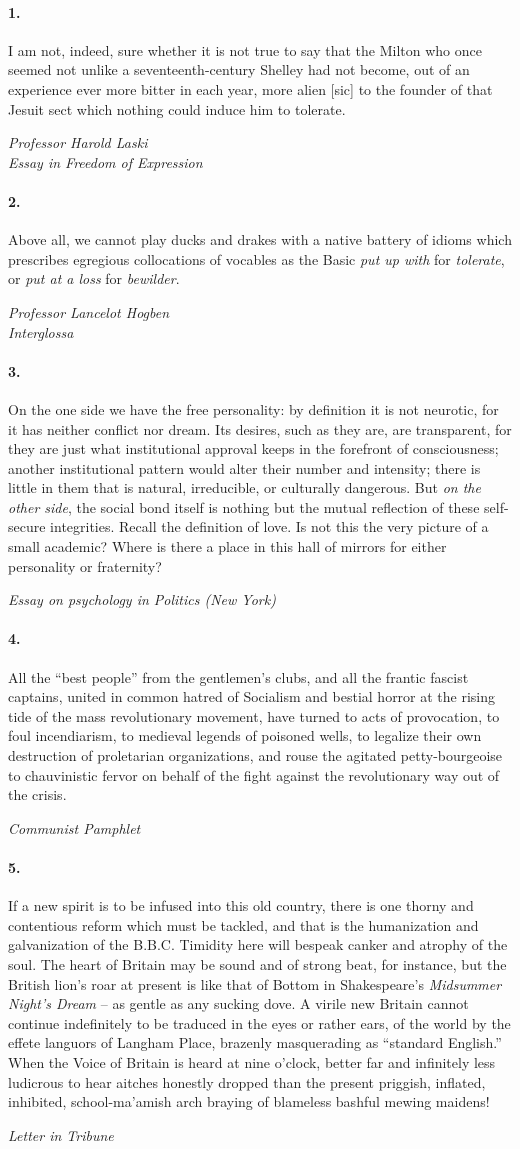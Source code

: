 \documentclass[article,twoside,a4paper]{memoir}
\newcommand{\exhibit}[3]{\paragraph{#1.} #2 \par \begin{flushright}\emph{#3}\end{flushright}}
\begin{document}
\exhibit{1}{
I am not, indeed, sure whether it
is not true to say that the Milton who once seemed not unlike a
seventeenth-century Shelley had not become, out of an experience ever
more bitter in each year, more alien [sic] to the founder of that
Jesuit sect which nothing could induce him to tolerate.
}{Professor Harold Laski \\ Essay in \emph{Freedom of Expression}}

\exhibit{2}{
Above all, we cannot play ducks and drakes with a native battery of idioms
which prescribes egregious collocations of vocables as the Basic \emph{put up
with} for \emph{tolerate}, or \emph{put at a loss} for \emph{bewilder}.
}{Professor Lancelot Hogben \\ \emph{Interglossa}}

\exhibit{3}{
On the one side we have the free personality: by definition it is not
neurotic, for it has neither conflict nor dream. Its desires, such as they
are, are transparent, for they are just what institutional approval keeps
in the forefront of consciousness; another institutional pattern would alter
their number and intensity; there is little in them that is natural, irreducible,
or culturally dangerous. But \emph{on the other side}, the social bond itself
is nothing but the mutual reflection of these self-secure integrities. Recall
the definition of love. Is not this the very picture of a small academic?
Where is there a place in this hall of mirrors for either personality or fraternity?
}{Essay on psychology in \emph{Politics} (New York)}

\exhibit{4}{
All the ``best people'' from the gentlemen's clubs, and all the
frantic fascist captains, united in common hatred of Socialism and bestial
horror at the rising tide of the mass revolutionary movement, have turned
to acts of provocation, to foul incendiarism, to medieval legends of poisoned
wells, to legalize their own destruction of proletarian organizations, and
rouse the agitated petty-bourgeoise to chauvinistic fervor on behalf of the
fight against the revolutionary way out of the crisis.
}{Communist Pamphlet}

\exhibit{5}{
If a new spirit is to be infused into this old country, there is one thorny
and contentious reform which must be tackled, and that is the humanization
and galvanization of the B.B.C. Timidity here will bespeak canker and atrophy
of the soul. The heart of Britain may be sound and of strong beat, for instance,
but the British lion's roar at present is like that of Bottom in Shakespeare's
\emph{Midsummer Night's Dream} -- as gentle as any sucking dove. A virile
new Britain cannot continue indefinitely to be traduced in the eyes or rather
ears, of the world by the effete languors of Langham Place, brazenly masquerading
as ``standard English.'' When the Voice of Britain is heard at nine
o'clock, better far and infinitely less ludicrous to hear aitches honestly
dropped than the present priggish, inflated, inhibited, school-ma'amish arch
braying of blameless bashful mewing maidens!
}{Letter in \emph{Tribune}}
\end{document}
